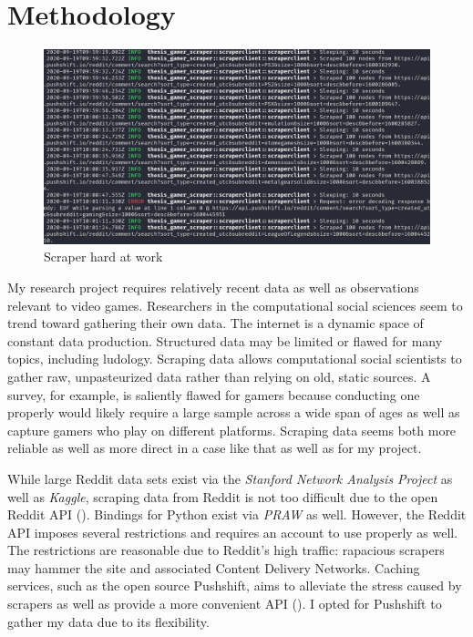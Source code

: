 \documentclass[12pt, a4paper]{article}
\begin{document}
\section{Methodology}

\begin{figure}[ht!]
  \includegraphics[width=\linewidth]{scraper_at_work.png}
  \caption{Scraper hard at work}
  \label{fig:workingscraper}
\end{figure}

My research project requires relatively recent data as well as observations relevant to video games. Researchers in the computational social sciences seem to trend toward gathering their own data. The internet is a dynamic space of constant data production. Structured data may be limited or flawed for many topics, including ludology. Scraping data allows computational social scientists to gather raw, unpasteurized data rather than relying on old, static sources. A survey, for example, is saliently flawed for gamers because conducting one properly would likely require a large sample across a wide span of ages as well as capture gamers who play on different platforms. Scraping data seems both more reliable as well as more direct in a case like that as well as for my project.

While large Reddit data sets exist via the \textit{Stanford Network Analysis Project} as well as \textit{Kaggle}, scraping data from Reddit is not too difficult due to the open Reddit API (\cite{redditapi}). Bindings for Python exist via \textit{PRAW} as well. However, the Reddit API imposes several restrictions and requires an account to use properly as well. The restrictions are reasonable due to Reddit's high traffic: rapacious scrapers may hammer the site and associated Content Delivery Networks. Caching services, such as the open source Pushshift, aims to alleviate the stress caused by scrapers as well as provide a more convenient API (\cite{pushshiftapi}). I opted for Pushshift to gather my data due to its flexibility.
\end{document}
